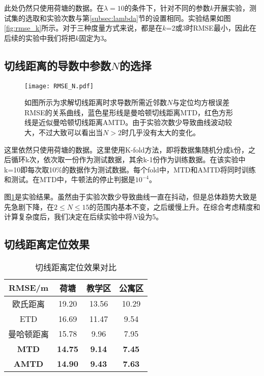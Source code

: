 此处仍然只使用荷塘的数据。在$\lambda=10$的条件下，针对不同的参数$k$开展实验，测试集的选取和实验次数与第\ref{subsec:lambda}节的设置相同。实验结果如图\ref{fig:rmse_k}所示。对于三种度量方式来说，都是在$k$=2或3时RMSE最小，因此在后续的实验中我们将把$k$固定为3。

\subsection{切线距离的导数中参数$N$的选择}

\begin{figure}
	\centering
	\texttt{[image: RMSE\_N.pdf]}
	\caption{如图所示为求解切线距离时求导数所需近邻数$N$与定位均方根误差RMSE的关系曲线，蓝色星形线是曼哈顿切线距离MTD，红色方形线是近似曼哈顿切线距离AMTD。由于实验次数少导致曲线波动较大，不过大致可以看出当$N>2$时几乎没有太大的变化。}
	\label{fig:rmse_n}
\end{figure}

这里依然只使用荷塘的数据。这里使用K-fold方法，即将数据集随机分成k份，之后循环k次，依次取一份作为测试数据，其余k-1份作为训练数据。在该实验中k=10即每次取10\%的数据作为测试数据。每个fold中，MTD和AMTD将同时训练和测试。在MTD中，牛顿法的停止判据是$10^{-4}$。

图\ref{fig:rmse_n}是实验结果。虽然由于实验次数少导致曲线一直在抖动，但是总体趋势大致是先急剧下降，在$2 \le N \le 15$的范围内基本不变，之后缓慢上升。在综合考虑精度和计算复杂度后，我们决定在后续实验中将$N$设为5。

\subsection{切线距离定位效果}

\begin{table}[tbp]
	\caption{切线距离定位效果对比}
	\begin{center}
		\begin{tabular}{cccc}
			\toprule
			RMSE/m &  荷塘 & 教学区 & 公寓区 \\
			\midrule
			欧氏距离 & 19.20 & 13.56 & 10.29 \\
			\midrule
			ETD & 16.69 & 11.47 & 9.54 \\
			\midrule
			曼哈顿距离 & 15.78 & 9.96 & 7.95 \\
			\midrule
			\textbf{MTD} & \textbf{14.75} & \textbf{9.14} & \textbf{7.45} \\
			\midrule
			\textbf{AMTD} & \textbf{14.90} & \textbf{9.43} & \textbf{7.63} \\
			\bottomrule
		\end{tabular}
		\label{tab:td}
	\end{center}
\end{table}

